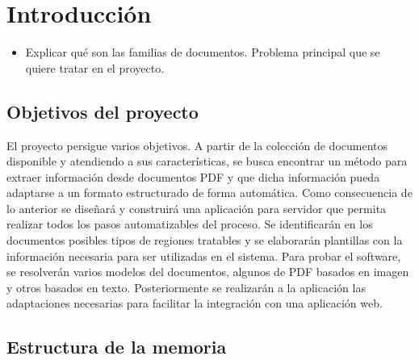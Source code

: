 
\chapter{Introducción}
\label{chap:introduccion}

\begin{itemize}
    \item Explicar qué son las familias de documentos. Problema principal que se quiere tratar en el proyecto.
\end{itemize}

\section{Objetivos del proyecto}

El proyecto persigue varios objetivos. A partir de la colección de documentos disponible y atendiendo a sus características, se busca encontrar un método para extraer información desde documentos PDF y que dicha información pueda adaptarse a un formato estructurado de forma automática. Como consecuencia de lo anterior se diseñará y construirá una aplicación para servidor que permita realizar todos los pasos automatizables del proceso. Se identificarán en los documentos posibles tipos de regiones tratables y se elaborarán plantillas con la información necesaria para ser utilizadas en el sistema. Para probar el software, se resolverán varios modelos del documentos, algunos de PDF basados en imagen y otros basados en texto. Posteriormente se realizarán a la aplicación las adaptaciones necesarias para facilitar la integración con una aplicación web.


\section{Estructura de la memoria}